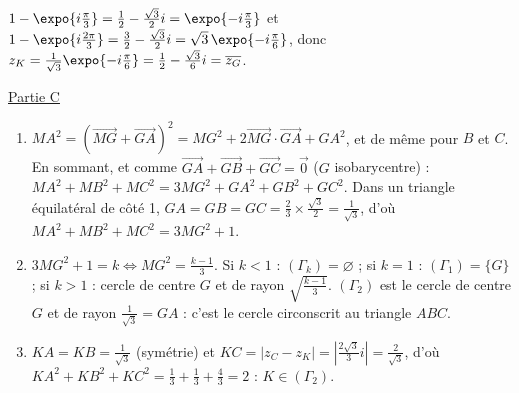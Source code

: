 \begin{corrige}
\begin{enumerate}
      $1 - \expo{i\frac{\pi}{3}} = \frac{1}{2} - \frac{\sqrt{3}}{2}i = \expo{-i\frac{\pi}{3}}$ et
      $1 - \expo{i\frac{2\pi}{3}} = \frac{3}{2} - \frac{\sqrt{3}}{2}i = \sqrt{3}\,\expo{-i\frac{\pi}{6}}$, donc
      $z_K = \frac{1}{\sqrt{3}}\expo{-i\frac{\pi}{6}} = \frac{1}{2} - \frac{\sqrt{3}}{6}i = \overline{z_G}$.
\end{enumerate}
\underline{Partie C}
\begin{enumerate}
\item $MA^2 = (\overrightarrow{MG} + \overrightarrow{GA})^2 = MG^2 + 2\overrightarrow{MG}\cdot\overrightarrow{GA} + GA^2$, et de m\^eme pour $B$ et $C$.
      En sommant, et comme $\overrightarrow{GA} + \overrightarrow{GB} + \overrightarrow{GC} = \vec{0}$ ($G$ isobarycentre) :
      $MA^2 + MB^2 + MC^2 = 3MG^2 + GA^2 + GB^2 + GC^2$. Dans un triangle \'equilat\'eral de c\^ot\'e 1,
      $GA = GB = GC = \frac{2}{3} \times \frac{\sqrt{3}}{2} = \frac{1}{\sqrt{3}}$, d'o\`u $MA^2 + MB^2 + MC^2 = 3MG^2 + 1$.
\item $3MG^2 + 1 = k \iff MG^2 = \frac{k - 1}{3}$. Si $k < 1$ : $(\Gamma_k) = \varnothing$ ; si $k = 1$ : $(\Gamma_1) = \{G\}$ ;
      si $k > 1$ : cercle de centre $G$ et de rayon $\sqrt{\frac{k-1}{3}}$. $(\Gamma_2)$ est le cercle de centre $G$ et de rayon
      $\frac{1}{\sqrt{3}} = GA$ : c'est le cercle circonscrit au triangle $ABC$.
\item $KA = KB = \frac{1}{\sqrt{3}}$ (sym\'etrie) et $KC = |z_C - z_K| = \left|\frac{2\sqrt{3}}{3}i\right| = \frac{2}{\sqrt{3}}$, d'o\`u
      $KA^2 + KB^2 + KC^2 = \frac{1}{3} + \frac{1}{3} + \frac{4}{3} = 2$ : $K \in (\Gamma_2)$.
\end{enumerate}


\end{corrige}
